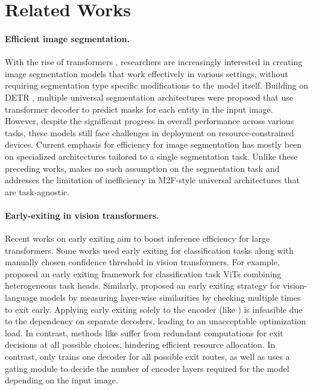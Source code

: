 \section{Related Works}
\label{sec:related_works}
\paragraph{Efficient image segmentation.} 
With the rise of transformers \cite{vaswani2017attention}, researchers are increasingly interested in creating image segmentation models that work effectively in various settings, without requiring segmentation type specific modifications to the model itself. Building on DETR \cite{carion2020end}, multiple universal segmentation architectures were proposed \cite{cheng2021per,cheng2021mask2former, jain2023oneformer, gu2024dataseg} that use transformer decoder to predict masks for each entity in the input image. However, despite the significant progress in overall performance across various tasks, these models still face challenges in deployment on resource-constrained devices. Current emphasis \cite{cheng2020panoptic, fan2021rethinking, hou2020real, hu2023you, 10296714, xu2023pidnet, yu2018bisenet, yu2021bisenet} for efficiency for image segmentation has mostly been on specialized architectures tailored to a single segmentation task. Unlike these preceding works, \ours makes no such assumption on the segmentation task and addresses the limitation of inefficiency in M2F-style universal architectures that are task-agnostic.

\paragraph{Early-exiting in vision transformers.} 
Recent works on early exiting \cite{wan2023efficient, xu2024survey, tang2023you, xu2023lgvit, liu2021mevt, wang2022single, jiang2023multi, yang2023exploiting, valade2024eero, tang2023need, zhang2023adaptive} aim to boost inference efficiency for large transformers. Some works \cite{xu2023lgvit, liu2021mevt, tang2023you} used early exiting for classification tasks along with manually chosen confidence threshold in vision transformers. For example, \cite{xu2023lgvit} proposed an early exiting framework for classification task ViTs combining heterogeneous task heads. Similarly, \cite{tang2023you} proposed an early exiting strategy for vision-language models by measuring layer-wise similarities by checking multiple times to exit early.  Applying early exiting solely to the encoder (like \cite{xu2023lgvit}) is infeasible due to the dependency on separate decoders, leading to an unacceptable optimization load. In contrast, methods like \cite{tang2023you} suffer from redundant computations for exit decisions at all possible choices, hindering efficient resource allocation. In contrast, \ours only trains one decoder for all possible exit routes, as well as uses a gating module to decide the number of encoder layers required for the model depending on the input image. 
